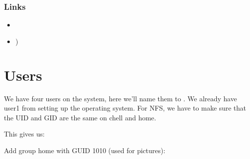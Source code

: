 \documentclass[a4paper,10pt,english]{sphinxmanual}
\begin{document}
\subsection{Links}
\label{\detokenize{services:id2}}\begin{itemize}
\item {} 

\item {} 
)

\end{itemize}


\chapter{Users}
\label{\detokenize{users:users}}\label{\detokenize{users::doc}}
We have four users on the system, here we’ll name them  to . We
already have user1 from setting up the operating system.  For NFS, we have to
make sure that the UID and GID are the same on chell and home.

\begin{sphinxVerbatim}[commandchars=\\\{\}]
  
  
  
\end{sphinxVerbatim}

This gives us:

\begin{sphinxVerbatim}[commandchars=\\\{\}]
   
   
   
   
\end{sphinxVerbatim}

Add group home with GUID 1010 (used for pictures):

\begin{sphinxVerbatim}[commandchars=\\\{\}]
    

   
   
   
   
\end{sphinxVerbatim}
\end{document}
